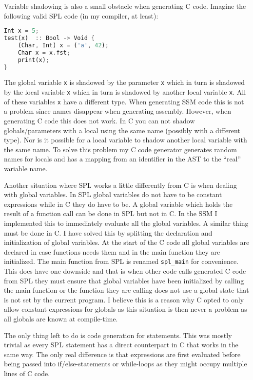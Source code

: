 \documentclass{article}
\begin{document}
Variable shadowing is also a small obstacle when generating C code. Imagine the following valid SPL code (in my compiler, at least):
\begin{lstlisting}[language=Rust, style=boxed]
Int x = 5;
test(x)  :: Bool -> Void {
	(Char, Int) x = ('a', 42);
	Char x = x.fst;
	print(x);
}
\end{lstlisting}

The global variable \texttt{x} is shadowed by the parameter \texttt{x} which in turn is shadowed by the local variable \texttt{x} which in turn is shadowed by another local variable \texttt{x}. All of these variables \texttt{x} have a different type. When generating SSM code this is not a problem since names disappear when generating assembly. However, when generating C code this does not work. In C you can not shadow globals/parameters with a local using the same name (possibly with a different type). Nor is it possible for a local variable to shadow another local variable with the same name. To solve this problem my C code generator generates random names for locals and has a mapping from an identifier in the AST to the ``real'' variable name.

Another situation where SPL works a little differently from C is when dealing with global variables. In SPL global variables do not have to be constant expressions while in C they do have to be. A global variable which holds the result of a function call can be done in SPL but not in C. In the SSM I implemented this to immediately evaluate all the global variables. A similar thing must be done in C. I have solved this by splitting the declaration and initialization of global variables. At the start of the C code all global variables are declared in case functions needs them and in the main function they are initialized. The main function from SPL is renamed \texttt{spl\_main} for convenience. This does have one downside and that is when other code calls generated C code from SPL they must ensure that global variables have been initialized by calling the main function or the function they are calling does not use a global state that is not set by the current program. I believe this is a reason why C opted to only allow constant expressions for globals as this situation is then never a problem as all globals are known at compile-time.

The only thing left to do is code generation for statements. This was mostly trivial as every SPL statement has a direct counterpart in C that works in the same way. The only real difference is that expressions are first evaluated before being passed into if/else-statements or while-loops as they might occupy multiple lines of C code.
\end{document}
